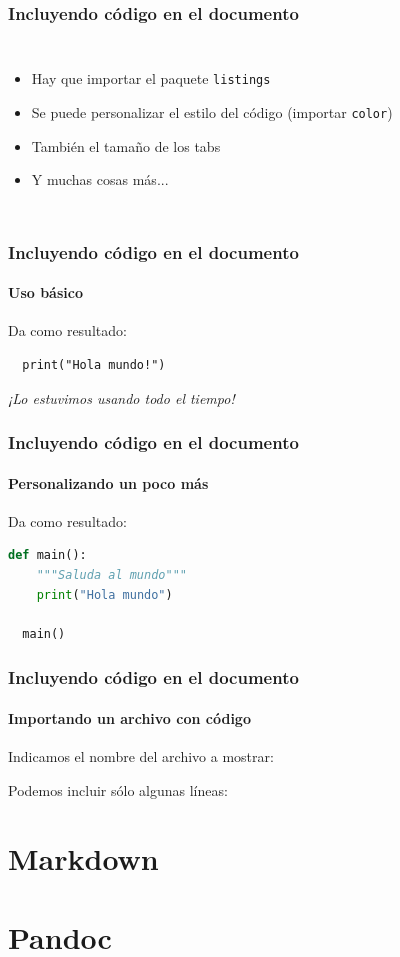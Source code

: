 \documentclass[svgnames]{beamer}
\begin{document}
\begin{frame}
  \frametitle{Incluyendo código en el documento}
  \begin{columns}
    \centering
      
    \centering
      \begin{itemize}
        \item Hay que importar el paquete \texttt{listings}
        \item Se puede personalizar el estilo del código (importar \texttt{color})
        \item También el tamaño de los tabs
        \item Y muchas cosas más...
      \end{itemize}
  \end{columns}
\end{frame}


\begin{frame}[fragile]
  \frametitle{Incluyendo código en el documento}
  \framesubtitle{Uso básico}
  

  \vfill

  Da como resultado:
  \begin{lstlisting}
  print("Hola mundo!")
  \end{lstlisting}\pause

  \vfill

  \begin{center}
    \emph{¡Lo estuvimos usando todo el tiempo!}
  \end{center}
\end{frame}

\begin{frame}[fragile]
  \frametitle{Incluyendo código en el documento}
  \framesubtitle{Personalizando un poco más}
  

  \vfill

  Da como resultado:
\begin{lstlisting}[language=python]
  def main():
    """Saluda al mundo"""
    print("Hola mundo")
  
  main()
\end{lstlisting}
\end{frame}

\begin{frame}[fragile]
  \frametitle{Incluyendo código en el documento}
  \framesubtitle{Importando un archivo con código}
  Indicamos el nombre del archivo a mostrar:
  \pause

  \vfill

  Podemos incluir sólo algunas líneas:
  

\end{frame}

\section{Markdown}


\section{Pandoc}
\end{document}
